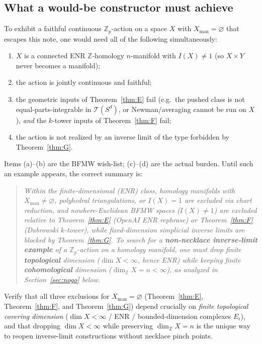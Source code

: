 \documentclass[11pt]{article}
\theoremstyle{definition}
\begin{document}
\subsection{What a would-be constructor must achieve}
\label{sec:constructor-burden}

To exhibit a faithful continuous $\mathbb{Z}_p$-action on a space $X$ with
$X_{\mathrm{man}}=\varnothing$ that escapes this note, one would need all of
the following simultaneously:
\begin{enumerate}[label=(\alph*)]
\item $X$ is a connected ENR $\mathbb{Z}$-homology $n$-manifold with
$I(X)\neq 1$ (so $X\times Y$ never becomes a manifold);
\item the action is jointly continuous and faithful;
\item the geometric inputs of Theorem~\ref{thm:E} fail (e.g.\ the pushed class
is not equal-parts-integrable in $\mathcal{T}(S^d)$, or Newman/averaging
cannot be run on $X$), \emph{and} the $k$-tower inputs of
Theorem~\ref{thm:F} fail;
\item the action is not realized by an inverse limit of the type forbidden by
Theorem~\ref{thm:G}.
\end{enumerate}
Items (a)--(b) are the BFMW wish-list; (c)--(d) are the actual burden.
Until such an example appears, the correct summary is:

\begin{quote}
\itshape
Within the finite-dimensional (ENR) class, homology manifolds with
$X_{\mathrm{man}}\neq\varnothing$, polyhedral triangulations, or $I(X)=1$ are
excluded via chart reduction, and nowhere-Euclidean BFMW spaces ($I(X)\neq 1$)
are excluded relative to Theorem~\ref{thm:E} (OpenAI ENR rephrase) or
Theorem~\ref{thm:F} (Dabrowski $k$-tower), while fixed-dimension simplicial
inverse limits are blocked by Theorem~\ref{thm:G}.
To search for a \textbf{non-necklace inverse-limit example} of a
$\mathbb{Z}_p$-action on a homology manifold, one must drop finite
\textbf{topological} dimension ($\dim X<\infty$, hence ENR) while keeping finite
\textbf{cohomological} dimension ($\dim_{\mathbb{Z}}X=n<\infty$), as analyzed in
Section~\ref{sec:nogo} below.
\end{quote}

\begin{checkboxenv}
Verify that all three exclusions for $X_{\mathrm{man}}=\varnothing$
(Theorem~\ref{thm:E}, Theorem~\ref{thm:F}, and Theorem~\ref{thm:G}) depend
crucially on \emph{finite topological covering dimension} ($\dim X<\infty$ /
ENR / bounded-dimension complexes $E_i$), and that dropping $\dim X<\infty$ while
preserving $\dim_{\mathbb{Z}}X=n$ is the unique way to reopen inverse-limit
constructions without necklace pinch points.
\end{checkboxenv}
\end{document}
